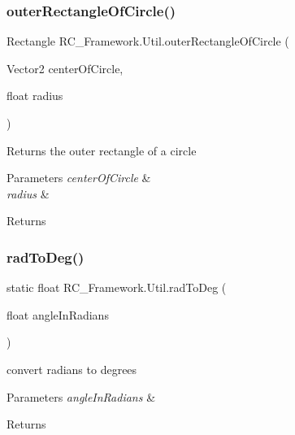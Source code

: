 \subsubsection{\texorpdfstring{outer\+Rectangle\+Of\+Circle()}{outerRectangleOfCircle()}}
{\footnotesize\ttfamily Rectangle R\+C\+\_\+\+Framework.\+Util.\+outer\+Rectangle\+Of\+Circle (\begin{DoxyParamCaption}\item[{Vector2}]{center\+Of\+Circle,  }\item[{float}]{radius }\end{DoxyParamCaption})}



Returns the outer rectangle of a circle 


\begin{DoxyParams}{Parameters}
{\em center\+Of\+Circle} & \\
\hline
{\em radius} & \\
\hline
\end{DoxyParams}
\begin{DoxyReturn}{Returns}

\end{DoxyReturn}
\mbox{\label{class_r_c___framework_1_1_util_a4f7b82a75ed62f22465f81917f0683ce}} 
\subsubsection{\texorpdfstring{rad\+To\+Deg()}{radToDeg()}}
{\footnotesize\ttfamily static float R\+C\+\_\+\+Framework.\+Util.\+rad\+To\+Deg (\begin{DoxyParamCaption}\item[{float}]{angle\+In\+Radians }\end{DoxyParamCaption})\hspace{0.3cm}{\ttfamily [static]}}



convert radians to degrees 


\begin{DoxyParams}{Parameters}
{\em angle\+In\+Radians} & \\
\hline
\end{DoxyParams}
\begin{DoxyReturn}{Returns}

\end{DoxyReturn}
\mbox{\label{class_r_c___framework_1_1_util_a5d6c5f7ec7c507c48a6f42fae4cdfb23}} 
